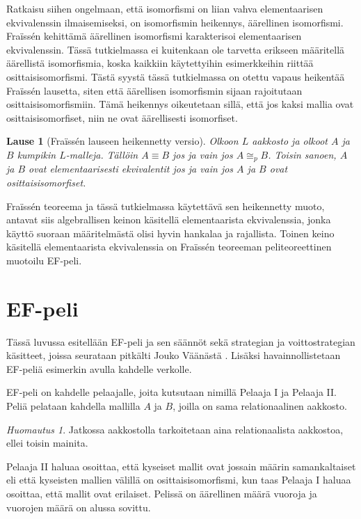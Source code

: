 \documentclass[finnish]{tktltiki2}
\newtheorem{lau}{Lause}
\theoremstyle{definition}
\theoremstyle{remark}
\newtheorem*{huom}{Huomautus}
\begin{document}
Ratkaisu siihen ongelmaan, että isomorfismi on liian vahva elementaarisen ekvivalenssin ilmaisemiseksi, on isomorfismin heikennys, äärellinen isomorfismi. Fraïssén kehittämä äärellinen isomorfismi karakterisoi elementaarisen ekvivalenssin. Tässä tutkielmassa ei kuitenkaan ole tarvetta erikseen määritellä äärellistä isomorfismia, koska kaikkiin käytettyihin esimerkkeihin riittää osittaisisomorfismi. Tästä syystä tässä tutkielmassa on otettu vapaus heikentää Fraïssén lausetta, siten että äärellisen isomorfismin sijaan rajoitutaan osittaisisomorfismiin. Tämä heikennys oikeutetaan sillä, että jos kaksi mallia ovat osittaisisomorfiset, niin ne ovat äärellisesti isomorfiset.

\begin{lau}[Fraïssén lauseen heikennetty versio]
Olkoon $L$ aakkosto ja olkoot $A$ ja $B$ kumpikin $L$-malleja. Tällöin $A \equiv B$ jos ja vain jos $A \cong_p B$. Toisin sanoen, $A$ ja $B$ ovat elementaarisesti ekvivalentit jos ja vain jos $A$ ja $B$ ovat osittaisisomorfiset.
\end{lau}

Fraïssén teoreema ja tässä tutkielmassa käytettävä sen heikennetty muoto, antavat siis algebrallisen keinon käsitellä elementaarista ekvivalenssia, jonka käyttö suoraan määritelmästä olisi hyvin hankalaa ja rajallista. Toinen keino käsitellä elementaarista ekvivalenssia on Fraïssén teoreeman peliteoreettinen muotoilu EF-peli.

\section{EF-peli}
Tässä luvussa esitellään EF-peli ja sen säännöt sekä strategian ja voittostrategian käsitteet, joissa seurataan pitkälti Jouko Väänästä \cite{Vaa11}. Lisäksi havainnollistetaan EF-peliä esimerkin avulla kahdelle verkolle.

EF-peli on kahdelle pelaajalle, joita kutsutaan nimillä Pelaaja I ja Pelaaja II. Peliä pelataan kahdella mallilla $A$ ja $B$, joilla on sama relationaalinen aakkosto. \begin{huom}
Jatkossa aakkostolla tarkoitetaan aina relationaalista aakkostoa, ellei toisin mainita.
\end{huom} Pelaaja II haluaa osoittaa, että kyseiset mallit ovat jossain määrin samankaltaiset eli että kyseisten mallien välillä on osittaisisomorfismi, kun taas Pelaaja I haluaa osoittaa, että mallit ovat erilaiset. Pelissä on äärellinen määrä vuoroja ja vuorojen määrä on alussa sovittu.
\end{document}
